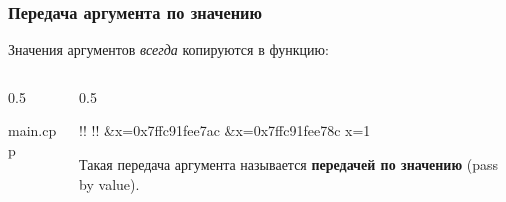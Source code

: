 \documentclass[compress, 8pt, aspectratio=169]{beamer}
\begin{document}
\begin{frame}[fragile]

    \frametitle{Передача аргумента по значению}

    Значения аргументов \textit{всегда}\footnotemark{} копируются в функцию:


    \begin{columns}[T]

        \begin{column}{0.5\textwidth}

                {main.cpp}

        \end{column}

        \begin{column}{0.5\textwidth}

            \begin{terminalwindow}
!!
!!
&x=0x7ffc91fee7ac
&x=0x7ffc91fee78c
x=1
            \end{terminalwindow}

            Такая передача аргумента называется \textbf{передачей по значению}
            (pass by value).

        \end{column}

    \end{columns}

\end{frame}
\end{document}
